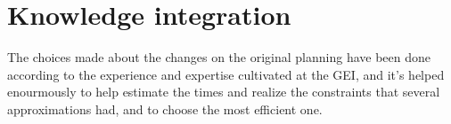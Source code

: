 \chapter{Knowledge integration}

The choices made about the changes on the original planning have been done according to the experience and expertise cultivated at the GEI, and it's helped enourmously to help estimate the times and realize the constraints that several approximations had, and to choose the most efficient one.
